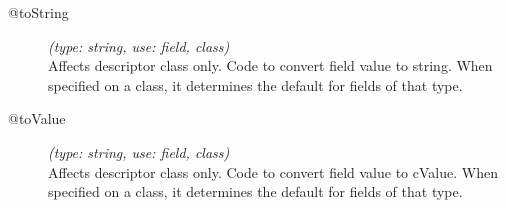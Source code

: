 \begin{description}
\item[@toString] \textit{(type: string, use: field, class)} \\
  Affects descriptor class only. Code to convert field value to string. When
  specified on a class, it determines the default for fields of that type.

\item[@toValue] \textit{(type: string, use: field, class)} \\
  Affects descriptor class only. Code to convert field value to cValue. When
  specified on a class, it determines the default for fields of that type.

\end{description}


